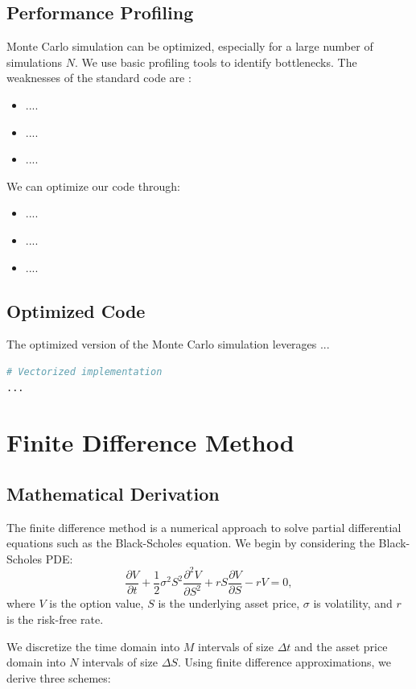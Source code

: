 \documentclass[12pt,a4paper]{report}
\begin{document}
\subsection{Performance Profiling}
Monte Carlo simulation can be optimized, especially for a large number of simulations \( N \). We use basic profiling tools to identify bottlenecks. The weaknesses of the standard code are :
\begin{itemize}
    \item ....
    \item ....
    \item ....
\end{itemize}
We can optimize our code through:
\begin{itemize}
    \item ....
    \item ....
    \item ....
\end{itemize}

\subsection{Optimized Code}
The optimized version of the Monte Carlo simulation leverages ...

\begin{lstlisting}[language=Python, caption={Optimized Monte Carlo Simulation}]
# Vectorized implementation
...
\end{lstlisting}


\section{Finite Difference Method}

\subsection{Mathematical Derivation}
The finite difference method is a numerical approach to solve partial differential equations such as the Black-Scholes equation. We begin by considering the Black-Scholes PDE:
\[
\frac{\partial V}{\partial t} + \frac{1}{2} \sigma^2 S^2 \frac{\partial^2 V}{\partial S^2} + rS \frac{\partial V}{\partial S} - rV = 0,
\]
where \( V \) is the option value, \( S \) is the underlying asset price, \( \sigma \) is volatility, and \( r \) is the risk-free rate.  

We discretize the time domain into \( M \) intervals of size \( \Delta t \) and the asset price domain into \( N \) intervals of size \( \Delta S \). Using finite difference approximations, we derive three schemes:
\end{document}
